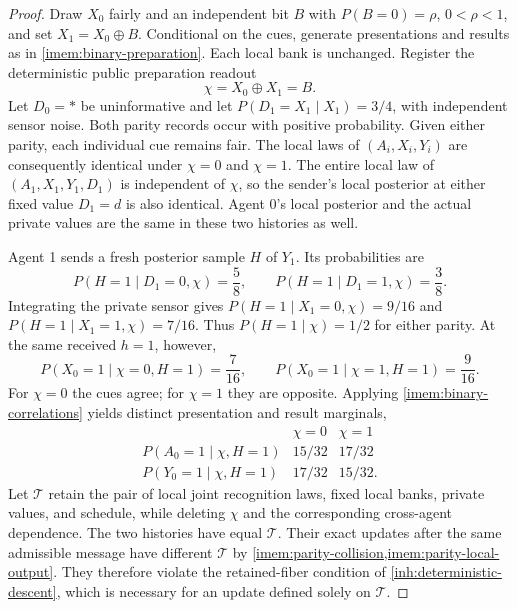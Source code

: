 \begin{proof}
Draw $X_0$ fairly and an independent bit $B$ with $P(B=0)=\rho$, $0<\rho<1$, and set $X_1=X_0\mathbin{\oplus}B$. Conditional on the cues, generate presentations and results as in \cref{imem:binary-preparation}. Each local bank is unchanged. Register the deterministic public preparation readout
\begin{equation}
 \chi=X_0\mathbin{\oplus}X_1=B.
 \label{imem:parity-record}
\end{equation}
Let $D_0=\ast$ be uninformative and let $P(D_1=X_1\mid X_1)=3/4$, with independent sensor noise. Both parity records occur with positive probability. Given either parity, each individual cue remains fair. The local laws of $(A_i,X_i,Y_i)$ are consequently identical under $\chi=0$ and $\chi=1$. The entire local law of $(A_1,X_1,Y_1,D_1)$ is independent of $\chi$, so the sender's local posterior at either fixed value $D_1=d$ is also identical. Agent 0's local posterior and the actual private values are the same in these two histories as well.

Agent 1 sends a fresh posterior sample $H$ of $Y_1$. Its probabilities are
\begin{equation}
 P(H=1\mid D_1=0,\chi)=\frac58,\qquad
 P(H=1\mid D_1=1,\chi)=\frac38.
 \label{imem:parity-message}
\end{equation}
Integrating the private sensor gives $P(H=1\mid X_1=0,\chi)=9/16$ and $P(H=1\mid X_1=1,\chi)=7/16$. Thus $P(H=1\mid \chi)=1/2$ for either parity. At the same received $h=1$, however,
\begin{equation}
 P(X_0=1\mid \chi=0,H=1)=\frac7{16},\qquad
 P(X_0=1\mid \chi=1,H=1)=\frac9{16}.
 \label{imem:parity-collision}
\end{equation}
For $\chi=0$ the cues agree; for $\chi=1$ they are opposite. Applying \cref{imem:binary-correlations} yields distinct presentation and result marginals,
\begin{equation}
 \begin{array}{c|cc}
 &\chi=0&\chi=1\\ \hline
 P(A_0=1\mid \chi,H=1)&15/32&17/32\\
 P(Y_0=1\mid \chi,H=1)&17/32&15/32.
 \end{array}
 \label{imem:parity-local-output}
\end{equation}
Let $\mathcal T$ retain the pair of local joint recognition laws, fixed local banks, private values, and schedule, while deleting $\chi$ and the corresponding cross-agent dependence. The two histories have equal $\mathcal T$. Their exact updates after the same admissible message have different $\mathcal T$ by \cref{imem:parity-collision,imem:parity-local-output}. They therefore violate the retained-fiber condition of \cref{inh:deterministic-descent}, which is necessary for an update defined solely on $\mathcal T$.
\end{proof}

